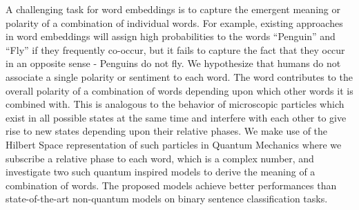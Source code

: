 A challenging task for word embeddings is to capture the emergent meaning or polarity of a combination of individual words. For example, existing approaches in word embeddings will assign high probabilities to the words ``Penguin'' and ``Fly'' if they frequently co-occur, but it fails to capture the fact that they occur in an opposite sense - Penguins do not fly. We hypothesize that humans do not associate a single polarity or sentiment to each word. The word contributes to the overall polarity of a combination of words depending upon which other words it is combined with. This is analogous to the behavior of microscopic particles which exist in all possible states at the same time and interfere with each other to give rise to new states depending upon their relative phases. We make use of the Hilbert Space representation of such particles in Quantum Mechanics where we subscribe a relative phase to each word, which is a complex number, and investigate two such quantum inspired models to derive the meaning of a combination of words. The proposed models achieve better performances than state-of-the-art non-quantum models on binary sentence classification tasks.
